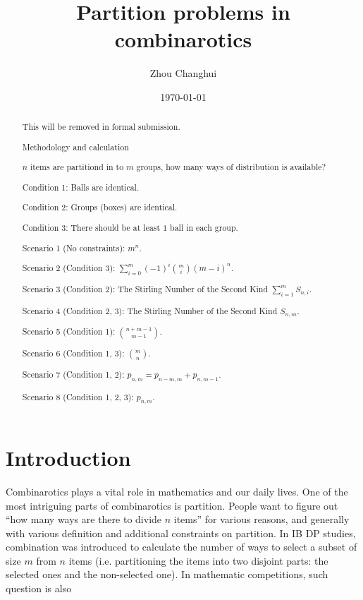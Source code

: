 \documentclass[a4paper]{article}
\begin{document}
\begin{titlepage}
    \title{\textbf{Partition problems in combinarotics}}
    \author{Zhou Changhui}
    \date{\today}
    \maketitle
\end{titlepage}

\begin{abstract}

This will be removed in formal submission.

Methodology and calculation

$n$ items are partitiond in to $m$ groups, how many ways of distribution is available?

Condition 1: Balls are identical.

Condition 2: Groups (boxes) are identical.

Condition 3: There should be at least $1$ ball in each group.

Scenario 1 (No constraints): $m^n$.

Scenario 2 (Condition 3): $\sum_{i=0}^{m}(-1)^{i}{m\choose i}(m-i)^{n}$.

Scenario 3 (Condition 2): The Stirling Number of the Second Kind $\sum_{i=1}^{m}S_{n,i}$.

Scenario 4 (Condition 2, 3): The Stirling Number of the Second Kind $S_{n,m}$.

Scenario 5 (Condition 1): ${n+m-1\choose m-1}$.

Scenario 6 (Condition 1, 3): ${m\choose n}$.

Scenario 7 (Condition 1, 2): $p_{n,m} = p_{n-m, m} + p_{n, m-1}$.

Scenario 8 (Condition 1, 2, 3): $p_{n, m}$.
    
\end{abstract}

\section{Introduction}

Combinarotics plays a vital role in mathematics and our daily lives. One of the most intriguing parts of combinarotics is partition. People want to figure out ``how many ways are there to divide $n$ items'' for various reasons, and generally with various definition and additional constraints on partition. In IB DP studies, combination was introduced to calculate the number of ways to select a subset of size $m$ from $n$ items (i.e. partitioning the items into two disjoint parts: the selected ones and the non-selected one). In mathematic competitions, such question is also 
\end{document}
